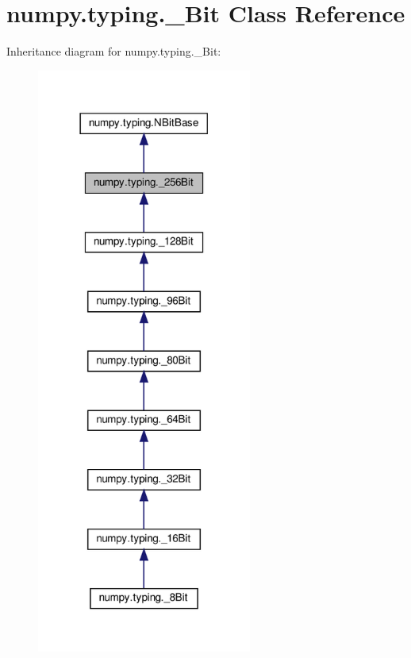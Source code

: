 \hypertarget{classnumpy_1_1typing_1_1__256Bit}{}\section{numpy.\+typing.\+\_\+Bit Class Reference}
\label{classnumpy_1_1typing_1_1__256Bit}


Inheritance diagram for numpy.\+typing.\+\_\+Bit\+:
\nopagebreak
\begin{figure}[H]
\begin{center}
\leavevmode
\includegraphics[width=200pt]{classnumpy_1_1typing_1_1__256Bit__inherit__graph}
\end{center}
\end{figure}


